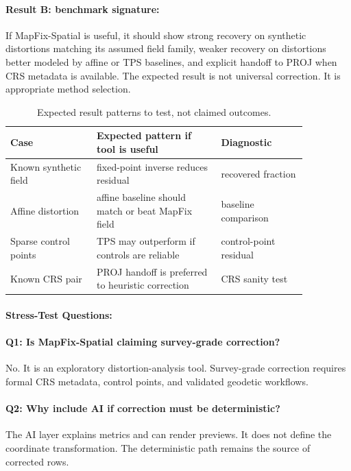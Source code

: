 \documentclass{article}
\begin{document}
\paragraph{Result B: benchmark signature:}

If MapFix-Spatial is useful, it should show strong recovery on synthetic distortions matching its assumed field family, weaker recovery on distortions better modeled by affine or TPS baselines, and explicit handoff to PROJ when CRS metadata is available. The expected result is not universal correction. It is appropriate method selection.

\begin{table}[t]
\centering
\caption{Expected result patterns to test, not claimed outcomes.}
\begin{tabular}{@{}p{0.25\linewidth}p{0.36\linewidth}p{0.25\linewidth}@{}}
\toprule
\textbf{Case} & \textbf{Expected pattern if tool is useful} & \textbf{Diagnostic}\\
\midrule
Known synthetic field & fixed-point inverse reduces residual & recovered fraction\\
Affine distortion & affine baseline should match or beat MapFix field & baseline comparison\\
Sparse control points & TPS may outperform if controls are reliable & control-point residual\\
Known CRS pair & PROJ handoff is preferred to heuristic correction & CRS sanity test\\
\bottomrule
\end{tabular}
\end{table}

\paragraph{Stress-Test Questions:}

\paragraph{Q1: Is MapFix-Spatial claiming survey-grade correction?}
No. It is an exploratory distortion-analysis tool. Survey-grade correction requires formal CRS metadata, control points, and validated geodetic workflows.

\paragraph{Q2: Why include AI if correction must be deterministic?}
The AI layer explains metrics and can render previews. It does not define the coordinate transformation. The deterministic path remains the source of corrected rows.
\end{document}
